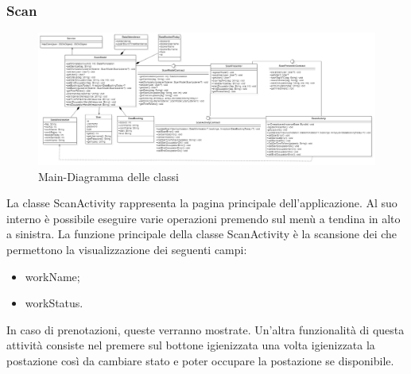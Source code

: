 \subsubsection{Scan}
\begin{figure}[H]
	\centering
	\includegraphics[width=16cm]{res/images/apputenti-MainClass.png}
	\caption{Main-Diagramma delle classi}
	\label{fig:Main-Diagramma delle classi}
\end{figure}
La classe ScanActivity rappresenta la pagina principale dell'applicazione. Al suo interno è possibile eseguire varie operazioni premendo sul menù a tendina in alto a sinistra.
La funzione principale della classe ScanActivity è la scansione dei  che permettono la visualizzazione dei seguenti campi:
\begin{itemize}
	\item workName; 
	\item workStatus. 
\end{itemize}
In caso di prenotazioni, queste verranno mostrate.
Un'altra funzionalità di questa attività consiste nel premere sul bottone igienizzata una volta igienizzata la postazione così da cambiare stato e poter occupare la postazione se disponibile.

